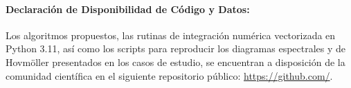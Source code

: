 \documentclass[11pt]{article}
\begin{document}
\paragraph{Declaración de Disponibilidad de Código y Datos:} Los algoritmos propuestos, las rutinas de integración numérica vectorizada en Python 3.11, así como los scripts para reproducir los diagramas espectrales y de Hovmöller presentados en los casos de estudio, se encuentran a disposición de la comunidad científica en el siguiente repositorio público: \url{https://github.com/}.



\end{document}
